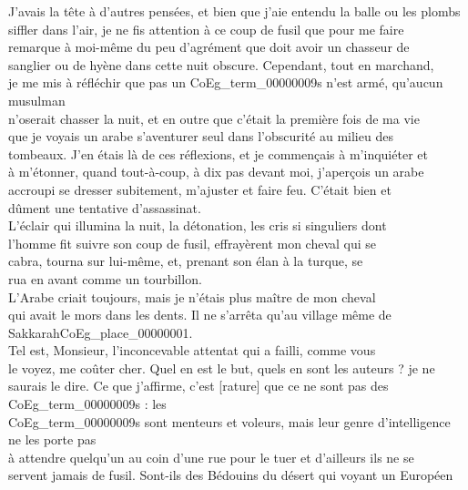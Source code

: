 \documentclass{book}
\begin{document}
J’avais la tête à d’autres pensées, et bien que j’aie entendu la balle ou les plombs\\
siffler dans l’air, je ne fis attention à ce coup de fusil que pour me faire\\
remarque à moi-même du peu d’agrément que doit avoir un chasseur de\\
sanglier ou de hyène dans cette nuit obscure. Cependant, tout en marchand,\\
je me mis à réfléchir que pas un \glspl{CoEg_term_00000009} n’est armé, qu’aucun musulman\\
n’oserait chasser la nuit, et en outre que c’était la première fois de ma vie\\
que je voyais un arabe s’aventurer seul dans l’obscurité au milieu des\\
tombeaux. J’en étais là de ces réflexions, et je commençais à m’inquiéter et\\
à m’étonner, quand tout-à-coup, à dix pas devant moi, j’aperçois un arabe\\
accroupi se dresser subitement, m’ajuster et faire feu. C’était bien et\\
dûment une tentative d’assassinat.\\
\indent L’éclair qui illumina la nuit, la détonation, les cris si singuliers dont\\
l’homme fit suivre son coup de fusil, effrayèrent mon cheval qui se\\
cabra, tourna sur lui-même, et, prenant son élan à la turque, se\\
rua en avant comme un tourbillon.\\
\indent L’Arabe criait toujours, mais je n’étais plus maître de mon cheval\\
qui avait le mors dans les dents. Il ne s’arrêta qu’au village même de Sakkarah\gls{CoEg_place_00000001}.\\
\indent Tel est, Monsieur, l’inconcevable attentat qui a failli, comme vous\\
le voyez, me coûter cher. Quel en est le but, quels en sont les auteurs ? je ne\\
saurais le dire. Ce que j’affirme, c’est [rature] que ce ne sont pas des \glspl{CoEg_term_00000009} : les\\
\glspl{CoEg_term_00000009} sont menteurs et voleurs, mais leur genre d’intelligence ne les porte pas\\
à attendre quelqu’un au coin d’une rue pour le tuer et d’ailleurs ils ne se\\
servent jamais de fusil. Sont-ils des Bédouins du désert qui voyant un Européen\\
\end{document}
